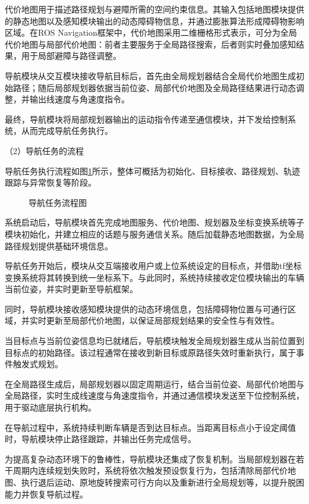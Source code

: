 代价地图用于描述路径规划与避障所需的空间约束信息。其输入包括地图模块提供的静态地图以及感知模块输出的动态障碍物信息，并通过膨胀算法形成障碍物影响区域。在ROS Navigation框架中，代价地图采用二维栅格形式表示，可分为全局代价地图与局部代价地图：前者主要服务于全局路径搜索，后者则实时叠加感知结果，用于局部避障与路径调整。

导航模块从交互模块接收导航目标后，首先由全局规划器结合全局代价地图生成初始路径；随后局部规划器依据当前位姿、局部代价地图及全局路径结果进行动态调整，并输出线速度与角速度指令。

最终，导航模块将局部规划器输出的运动指令传递至通信模块，并下发给控制系统，从而完成导航任务执行。

（2）导航任务的流程

导航任务执行流程如图\ref{导航任务流程图}所示，整体可概括为初始化、目标接收、路径规划、轨迹跟踪与异常恢复等阶段。

\begin{figure}[h]
\centering

\caption{导航任务流程图}
\label{导航任务流程图}
\end{figure}

系统启动后，导航模块首先完成地图服务、代价地图、规划器及坐标变换系统等子模块初始化，并建立相应的话题与服务通信关系。随后加载静态地图数据，为全局路径规划提供基础环境信息。

导航任务开始后，模块从交互端接收用户或上位系统设定的目标点，并借助tf坐标变换系统将其转换到统一坐标系下。与此同时，系统持续接收定位模块输出的车辆当前位姿，并实时更新至导航框架。

同时，导航模块接收感知模块提供的动态环境信息，包括障碍物位置与可通行区域，并实时更新至局部代价地图，以保证局部规划结果的安全性与有效性。

当目标点与当前位姿信息均已就绪后，导航模块触发全局规划器生成从当前位置到目标点的初始路径。该过程通常在接收到新目标或原路径失效时重新执行，属于事件触发式规划。

在全局路径生成后，局部规划器以固定周期运行，结合当前位姿、局部代价地图与全局路径，实时生成线速度与角速度指令，并通过通信模块发送至下位控制系统，用于驱动底层执行机构。

在导航过程中，系统持续判断车辆是否到达目标点。当距离目标点小于设定阈值时，导航模块停止路径跟踪，并输出任务完成信号。

为提高复杂动态环境下的鲁棒性，导航模块还集成了恢复机制。当局部规划器在若干周期内连续规划失败时，系统将依次触发预设恢复行为，包括清除局部代价地图、执行退后运动、原地旋转搜索可行方向以及重新进行全局规划等，以提升脱困能力并恢复导航过程。

